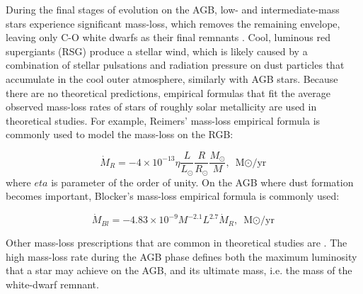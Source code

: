 During the final stages of evolution on the AGB, low- and intermediate-mass stars experience significant mass-loss, which removes the remaining envelope, leaving only C-O white dwarfs as their final remnants \citep{marigo2007evolution, pols2011stellar}. Cool, luminous red supergiants (RSG) produce a stellar wind, which is likely caused by a combination of stellar pulsations and radiation pressure on dust particles that accumulate in the cool outer atmosphere, similarly with AGB stars. Because there are no theoretical predictions, empirical formulas that fit the average observed mass-loss rates of stars of roughly solar metallicity are used in theoretical studies. For example, Reimers' mass-loss empirical formula \citep{reimers1975circumstellar} is commonly used to model the mass-loss on the RGB:

\begin{equation}
    \dot{M}_{R} = -4 \times 10^{-13} \eta 
    \frac{L}{L_{\odot}}  \frac{R}{R_{\odot}} \frac{M_{\odot}}{M},
    \text{ M${\odot}$/yr}
\end{equation}\label{eq:reimers}
where $eta$ is parameter of the order of unity. On the AGB where dust formation becomes important, Blocker's mass-loss empirical formula \citep{bloecker1995stellarI,bloecker1995stellarII} is commonly used:

\begin{equation}
    \dot{M}_{Bl} = -4.83 \times 10^{-9} M^{-2.1} L^{2.7} \dot{M}_{R},
    \text{ M${\odot}$/yr}
\end{equation}\label{eq:reimers}

Other mass-loss prescriptions that are common in theoretical studies are \cite{de1988mass,nieuwenhuijzen1990parametrization}. The high mass-loss rate during the AGB phase defines both the maximum luminosity that a star may achieve on the AGB, and its ultimate mass, i.e. the mass of the white-dwarf remnant.

